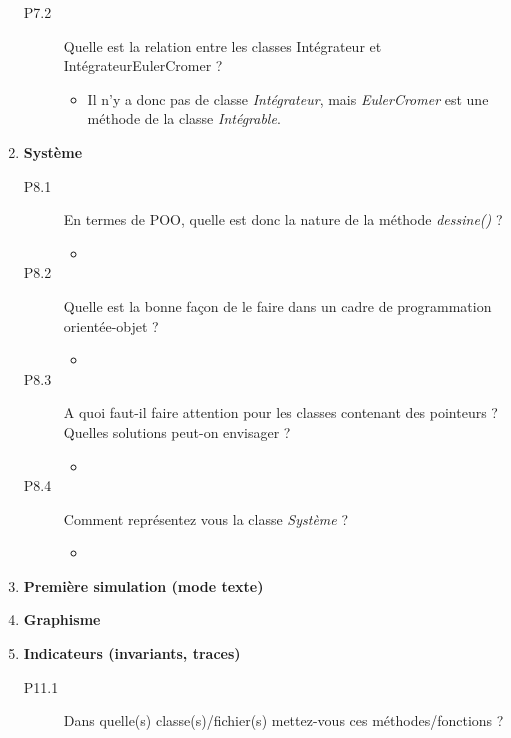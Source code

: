 \documentclass[a4paper]{article}
\begin{document}
\begin{enumerate}
\begin{description}
				\item[P7.2] Quelle est la relation entre les classes Intégrateur et IntégrateurEulerCromer ?
				
				\begin {itemize}
					\item Il n'y a donc pas de classe \emph{Intégrateur}, mais \emph{EulerCromer} est une méthode de la classe \emph{Intégrable}.
				\end {itemize}
			\end{description}
		\item \textbf{Système}
		
			\begin{description}
				\item[P8.1] En termes de POO, quelle est donc la nature de la méthode \emph{dessine()} ?
			
				\begin{itemize} 
					\item 
				\end{itemize}
			
				\item[P8.2] Quelle est la bonne façon de le faire dans un cadre de programmation orientée-objet ?
			
				\begin{itemize} 
					\item 
				\end{itemize}
			
				\item[P8.3] A quoi faut-il faire attention pour les classes contenant des pointeurs ? Quelles solutions peut-on envisager ?
			
				\begin{itemize} 
					\item 
				\end{itemize}

				\item[P8.4] Comment représentez vous la classe \emph{Système} ? 
			
				\begin{itemize} 
					\item 
				\end{itemize}

		\end{description}
		\item \textbf{Première simulation (mode texte)}
		\\
		\item \textbf{Graphisme}
		\\
		\item \textbf{Indicateurs (invariants, traces)}
			\begin{description}
				\item[P11.1]  Dans quelle(s) classe(s)/fichier(s) mettez-vous ces méthodes/fonctions ?
				

\end{description}
\end{enumerate}
\end{document}
